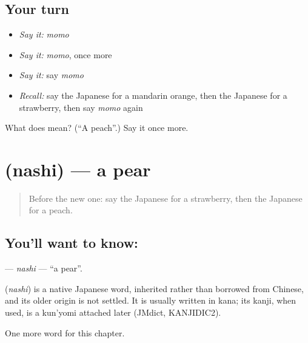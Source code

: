 \subsection*{Your turn}
\begin{itemize}
\raggedright
  \item \emph{Say it:} \emph{momo}
  \item \emph{Say it:} \emph{momo}, once more
  \item \emph{Say it:} say \emph{momo}
  \item \emph{Recall:} say the Japanese for a mandarin orange, then the Japanese for a strawberry, then say \emph{momo} again
\end{itemize}

\begin{tcolorbox}[breakable,colback=teal!4,colframe=teal!35!black,title={Before you move on}]
What does  mean? (\textquotedblleft{}A peach\textquotedblright{}.) Say it once more.
\end{tcolorbox}
\section[\texorpdfstring{\ja{なし} (nashi)}{なし (nashi)}]{ (nashi) — a pear}

\label{lesson:JA-C33-nashi}



\begin{quote}
Before the new one: say the Japanese for a strawberry, then the Japanese for a peach.
\end{quote}

\subsection*{You'll want to know: }
\textbf{} — \emph{nashi} — \textquotedblleft{}a pear\textquotedblright{}.

\begin{cousinweb}
\textbf{} (\emph{nashi}) is a native Japanese word, inherited rather than borrowed from Chinese, and its older origin is not settled. It is usually written in kana; its kanji, when used, is a kun'yomi attached later (JMdict, KANJIDIC2).
\end{cousinweb}

\begin{grammarlens}[title={What you've built}]
One more word for this chapter.
\end{grammarlens}

